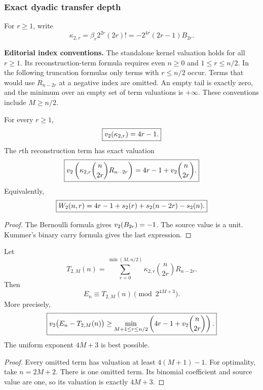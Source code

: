 \subsubsection{Exact dyadic transfer depth}

For \(r\geq1\), write
\[
\kappa_{2,r}
=
\beta_r2^{2r}(2r)!
=
-2^{4r}(2r-1)B_{2r}.
\]

\begin{histtheorem}\label{hist:thm:exact_dyadic_kernel_weight}
\par\noindent\textbf{Editorial index conventions.} The standalone kernel valuation holds for all $r\ge1$. Its reconstruction-term formula requires even $n\ge0$ and $1\le r\le n/2$. In the following truncation formulas only terms with $r\le n/2$ occur. Terms that would use $R_{n-2r}$ at a negative index are omitted. An empty tail is exactly zero, and the minimum over an empty set of term valuations is $+\infty$. These conventions include $M\ge n/2$.\par\medskip
For every \(r\geq1\),
\[
\boxed{v_2(\kappa_{2,r})=4r-1.}
\]
The \(r\)th reconstruction term has exact valuation
\[
\boxed{
v_2\left(
\kappa_{2,r}\binom n{2r}R_{n-2r}
\right)
=
4r-1+v_2\binom n{2r}.
}
\]
Equivalently,
\[
\boxed{
W_2(n,r)
=
4r-1+s_2(r)+s_2(n-2r)-s_2(n).
}
\]
\end{histtheorem}

\begin{proof}
The Bernoulli formula gives \(v_2(B_{2r})=-1\). The source value is a unit. Kummer's binary carry formula gives the last expression.
\end{proof}

\begin{histtheorem}\label{hist:thm:optimal_dyadic_truncation}
Let
\[
T_{2,M}(n)
=
\sum_{r=0}^{\min(M,n/2)}
\kappa_{2,r}\binom n{2r}R_{n-2r}.
\]
Then
\[
\boxed{
E_n\equiv T_{2,M}(n)\pmod {2^{4M+3}}.
}
\]
More precisely,
\[
\boxed{
v_2\bigl(E_n-T_{2,M}(n)\bigr)
\geq
\min_{M+1\leq r\leq n/2}
\left(
4r-1+v_2\binom n{2r}
\right).
}
\]
The uniform exponent \(4M+3\) is best possible.
\end{histtheorem}

\begin{proof}
Every omitted term has valuation at least \(4(M+1)-1\). For optimality, take \(n=2M+2\). There is one omitted term. Its binomial coefficient and source value are one, so its valuation is exactly \(4M+3\).
\end{proof}

